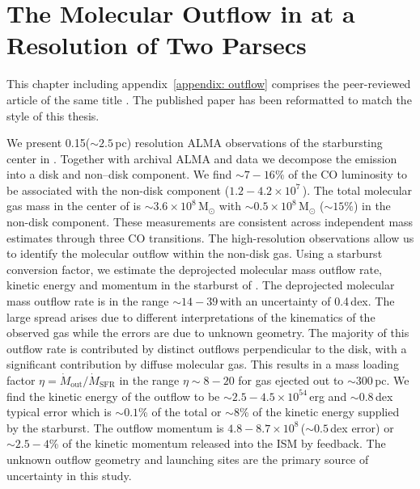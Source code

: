 
\chapter{The Molecular Outflow in  at a Resolution of Two Parsecs}
\label{chapter: outflow}


\begin{papernote}
This chapter including appendix~\ref{appendix: outflow} comprises the peer-reviewed article of the same title \citep{2019ApJ...881...43K}. The published paper has been reformatted to match the style of this thesis.
\end{papernote}


\begin{paperabstract}
We present 0.15\arcsec ($\sim2.5$\,pc) resolution ALMA  observations of the starbursting center in . Together with archival ALMA  and  data we decompose the emission into a disk and non--disk component. 
We find $\sim7-16\%$ of the CO luminosity to be associated with the non-disk component ($1.2-4.2 \times 10^7$\,\Kkmspc). The total molecular gas mass in the center of  is $\sim3.6\times10^8$\,M$_\odot$ with $\sim0.5\times10^8$\,M$_\odot$ ($\sim15\%$) in the non-disk component. These measurements are consistent across independent mass estimates through three CO transitions. 
The high-resolution  observations allow us to identify the molecular outflow within the non-disk gas. Using a starburst conversion factor, we estimate the deprojected molecular mass outflow rate, kinetic energy and momentum in the starburst of . The deprojected molecular mass outflow rate is in the range $\sim 14-39$\,\Msunyr with an uncertainty of 0.4\,dex. The large spread arises due to different interpretations of the kinematics of the observed gas while the errors are due to unknown geometry. The majority of this outflow rate is contributed by distinct outflows perpendicular to the disk, with a significant contribution by diffuse molecular gas. This results in a mass loading factor $\eta = \dot{M}_\mathrm{out} / \dot{M}_\mathrm{SFR}$ in the range $\eta\sim8-20$ for gas ejected out to $\sim300$\,pc. 
We find the kinetic energy of the outflow to be $\sim2.5-4.5\times10^{54}$\,erg and $\sim0.8$\,dex typical error which is $\sim0.1$\% of the total or $\sim8$\% of the kinetic energy supplied by the starburst. The outflow momentum is $4.8-8.7\times10^8$\,\Msunkms ($\sim0.5$\,dex error) or $\sim2.5-4$\% of the kinetic momentum released into the ISM by feedback. 
The unknown outflow geometry and launching sites are the primary source of uncertainty in this study.
\end{paperabstract}


